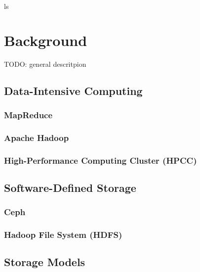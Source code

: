 ls
\chapter{Background}
\label{chapter:two}

TODO: general descritpion

\section{Data-Intensive Computing}

\subsection{MapReduce}
\subsection{Apache Hadoop}
\subsection{High-Performance Computing Cluster (HPCC)}

\section{Software-Defined Storage}
\subsection{Ceph}
\subsection{Hadoop File System (HDFS)}


\section{Storage Models}

